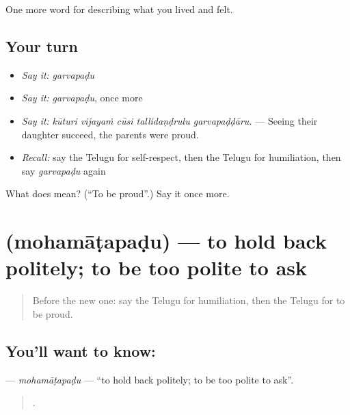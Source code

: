 \begin{grammarlens}[title={What you've built}]
One more word for describing what you lived and felt.
\end{grammarlens}

\subsection*{Your turn}
\begin{itemize}
\raggedright
  \item \emph{Say it:} \emph{garvapaḍu}
  \item \emph{Say it:} \emph{garvapaḍu}, once more
  \item \emph{Say it:} \emph{kūturi vijayaṁ cūsi tallidaṇḍrulu garvapaḍḍāru.} — Seeing their daughter succeed, the parents were proud.
  \item \emph{Recall:} say the Telugu for self-respect, then the Telugu for humiliation, then say \emph{garvapaḍu} again
\end{itemize}

\begin{tcolorbox}[breakable,colback=teal!4,colframe=teal!35!black,title={Before you move on}]
What does  mean? (\textquotedblleft{}To be proud\textquotedblright{}.) Say it once more.
\end{tcolorbox}
\section[\texorpdfstring{\te{మొహమాటపడు} (mohamāṭapaḍu)}{మొహమాటపడు (mohamāṭapaḍu)}]{ (mohamāṭapaḍu) — to hold back politely; to be too polite to ask}

\label{lesson:TE-C498-mohamatapadu}



\begin{quote}
Before the new one: say the Telugu for humiliation, then the Telugu for to be proud.
\end{quote}

\subsection*{You'll want to know: }
\textbf{} — \emph{mohamāṭapaḍu} — \textquotedblleft{}to hold back politely; to be too polite to ask\textquotedblright{}.

\begin{quote}
    .
\end{quote}

